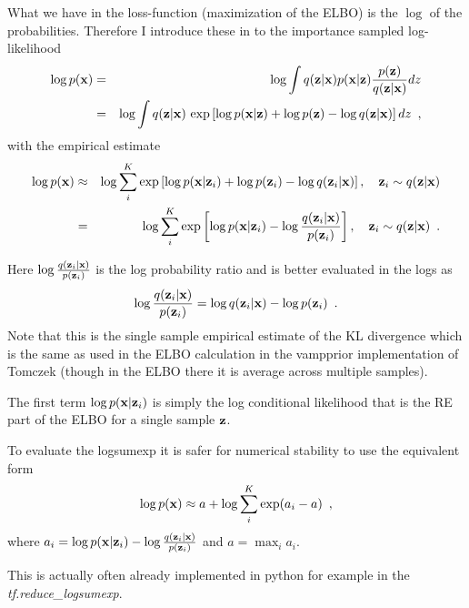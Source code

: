 What we have in the loss-function (maximization of the ELBO) is the $\log$ of the probabilities. Therefore I introduce these in to the importance sampled log-likelihood
\begin{eqnarray}
\log p(\mathbf{x}) 
& = & \log \int q(\mathbf{z} | \mathbf{x}) p(\mathbf{x} | \mathbf{z}) \frac{p(\mathbf{z}) }{q(\mathbf{z} | \mathbf{x})} dz  \nonumber \\
& = & \log \int q(\mathbf{z} | \mathbf{x}) \, \exp \left[ \log p(\mathbf{x} | \mathbf{z})  + \log p(\mathbf{z}) - \log q(\mathbf{z} | \mathbf{x}) \right] dz
\enspace ,
\end{eqnarray}
with the empirical estimate
\begin{eqnarray}
\log p(\mathbf{x}) &\approx& \log \sum_i^K \exp \left[ \log p(\mathbf{x} | \mathbf{z}_i)  + \log p(\mathbf{z}_i) - \log q(\mathbf{z}_i | \mathbf{x}) \right], \quad \mathbf{z}_i \sim q(\mathbf{z}| \mathbf{x}) \nonumber \\
& = & \log \sum_i^K \exp \left[ \log p(\mathbf{x} | \mathbf{z}_i) - \log \frac{q(\mathbf{z}_i | \mathbf{x})}{p(\mathbf{z}_i)} \right], \quad \mathbf{z}_i \sim q(\mathbf{z}| \mathbf{x})
  \enspace . 
\end{eqnarray}

Here $\log \frac{q(\mathbf{z}_i | \mathbf{x})}{p(\mathbf{z}_i)}$ is the log probability ratio and is better evaluated in the logs as 
\begin{equation}
\log \frac{q(\mathbf{z}_i | \mathbf{x})}{p(\mathbf{z}_i)} = \log q(\mathbf{z}_i | \mathbf{x}) - \log p(\mathbf{z}_i) \enspace .
\end{equation}
Note that this is the single sample empirical estimate of the KL divergence which is the same as used in the ELBO calculation in the vampprior implementation of Tomczek (though in the ELBO there it is average across multiple samples).

The first term $\log p(\mathbf{x} | \mathbf{z}_i)$ is simply the log conditional likelihood that is the RE part of the ELBO for a single sample $\mathbf{z}$.

To evaluate the logsumexp it is safer for numerical stability to use the equivalent form
\begin{equation}
\log p(\mathbf{x}) \approx a + \log \sum_i^K \exp (a_i - a) \enspace ,
\end{equation}
where 
$a_i = \log p(\mathbf{x} | \mathbf{z}_i) - \log \frac{q(\mathbf{z}_i | \mathbf{x})}{p(\mathbf{z}_i)}$ and $a = \max_i a_i$.

This is actually often already implemented in python for example in the \emph{tf.reduce\_logsumexp}.
